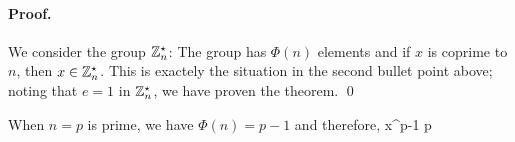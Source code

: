 \paragraph{Proof.} We consider the group $\mathbb{Z}_n^\star$: The group has $\Phi(n)$ elements and if $x$ is coprime to $n$, then $x \in \mathbb{Z}_n^\star$. This is exactely the situation in the second bullet point above; noting that $e = 1$ in $\mathbb{Z}_n^\star$, we have proven the theorem. \qed

\begin{theorem}

  When $n = p$ is prime, we have $\Phi(n) = p-1$ and therefore,
  \bee
  x^{p-1}  \bmod p
  \eee

\end{theorem}


